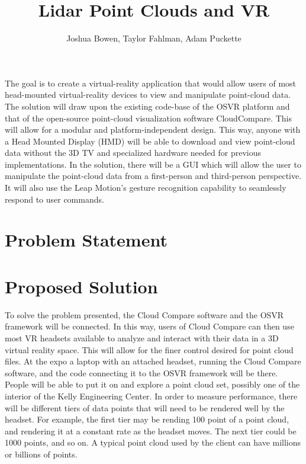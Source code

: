 \documentclass{article}
\begin{document}
\title{Lidar Point Clouds and VR}
\author{Joshua Bowen, Taylor Fahlman, Adam Puckette}

\maketitle

\abstract

The goal is to create a virtual-reality application that would allow users of most head-mounted virtual-reality devices to view and manipulate point-cloud data. The solution will draw upon the existing code-base of the OSVR platform and that of the open-source point-cloud visualization software CloudCompare. This will allow for a modular and platform-independent design. This way, anyone with a Head Mounted Display (HMD) will be able to download and view point-cloud data without the 3D TV and specialized hardware needed for previous implementations. In the solution, there will be a GUI which will allow the user to manipulate the point-cloud data from a first-person and third-person perspective. It will also use the Leap Motion's gesture recognition capability to seamlessly respond to user commands.


\section*{Problem Statement}

\section*{Proposed Solution}

To solve the problem presented, the Cloud Compare software and the OSVR framework will be connected. In this way, users of Cloud Compare can then use most VR headsets available to analyze and interact with their data in a 3D virtual reality space. This will allow for the finer control desired for point cloud files. At the expo a laptop with an attached headset, running the Cloud Compare software, and the code connecting it to the OSVR framework will be there. People will be able to put it on and explore a point cloud set, possibly one of the interior of the Kelly Engineering Center. In order to measure performance, there will be different tiers of data points that will need to be rendered well by the headset. For example, the first tier may be rending 100 point of a point cloud, and rendering it at a constant rate as the headset moves. The next tier could be 1000 points, and so on. A typical point cloud used by the client can have millions or billions of points. 
\end{document}
